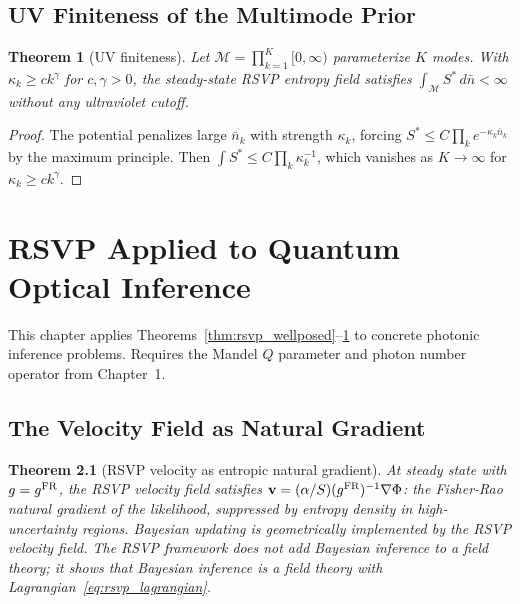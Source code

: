 \documentclass[11pt, openright, twoside]{book}
\theoremstyle{plain}
\newtheorem{theorem}{Theorem}[chapter]
\theoremstyle{definition}
\theoremstyle{remark}
\newcommand{\vfield}{\mathbf{v}}
\newcommand{\Sfield}{S}
\begin{document}
\section{UV Finiteness of the Multimode Prior}

\begin{theorem}[UV finiteness]
\label{thm:uv_finite}
Let $\mathcal{M}=\prod_{k=1}^K[0,\infty)$ parameterize $K$ modes. With $\kappa_k\geq ck^\gamma$
for $c,\gamma>0$, the steady-state RSVP entropy field satisfies
$\int_\mathcal{M}\Sfield^*\,d\bar n<\infty$ without any ultraviolet cutoff.
\end{theorem}

\begin{proof}
The potential penalizes large $\bar n_k$ with strength $\kappa_k$, forcing
$\Sfield^*\leq C\prod_k e^{-\kappa_k\bar n_k}$ by the maximum principle.
Then $\int\Sfield^*\leq C\prod_k\kappa_k^{-1}$, which vanishes as $K\to\infty$
for $\kappa_k\geq ck^\gamma$.
\end{proof}

\chapter{RSVP Applied to Quantum Optical Inference}

\begin{depbox}
This chapter applies Theorems~\ref{thm:rsvp_wellposed}--\ref{thm:uv_finite} to concrete
photonic inference problems. Requires the Mandel $Q$ parameter and photon number operator
from Chapter~1.
\end{depbox}

\section{The Velocity Field as Natural Gradient}

\begin{theorem}[RSVP velocity as entropic natural gradient]
At steady state with $g=g^{\rm FR}$, the RSVP velocity field satisfies
$\vfield=(\alpha/\Sfield)(g^{\rm FR})^{-1}\nabla\Phi$:
the Fisher-Rao natural gradient of the likelihood, suppressed by entropy density in
high-uncertainty regions. Bayesian updating is geometrically implemented by the RSVP
velocity field. The RSVP framework does not add Bayesian inference to a field theory;
it shows that Bayesian inference \emph{is} a field theory with Lagrangian~\eqref{eq:rsvp_lagrangian}.
\end{theorem}
\end{document}

